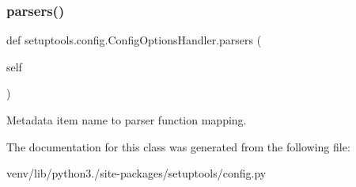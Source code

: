 \subsubsection{\texorpdfstring{parsers()}{parsers()}}
{\footnotesize\ttfamily def setuptools.\+config.\+Config\+Options\+Handler.\+parsers (\begin{DoxyParamCaption}\item[{}]{self }\end{DoxyParamCaption})}

\begin{DoxyVerb}Metadata item name to parser function mapping.\end{DoxyVerb}
 

The documentation for this class was generated from the following file\+:\begin{DoxyCompactItemize}
\item 
venv/lib/python3./site-\/packages/setuptools/config.\+py\end{DoxyCompactItemize}
